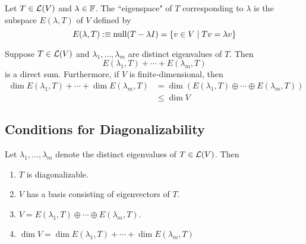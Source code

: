 \setcounter{thm}{51}
\label{eigenspace}
\begin{mydef} 
  Let $T \in \mathcal{L}(V)$ and $\lambda \in \mathbb{F}$. The ``eigenspace" of $T$ corresponding to $\lambda$ is the subspace $E(\lambda, T)$ of $V$ defined by
  \begin{equation}
    E(\lambda, T) :\equiv  \operatorname{null}(T-\lambda I) = \{ v\in V \mid Tv = \lambda v\}
  \end{equation}
\end{mydef}

\setcounter{thm}{53}
\begin{thm} 
  \label{thm: sum of eigenspaces is a direct sum}
  Suppose $T\in \mathcal{L} (V)$ and $\lambda_1, \dots, \lambda_m$ are distinct eigenvalues of $T$. Then
  \begin{equation}
    E(\lambda_1, T) + \cdots + E(\lambda_m, T)
  \end{equation}
  is a direct sum. Furthermore, if $V$ is finite-dimensional, then
  \begin{equation}
    \begin{aligned}
      \dim E(\lambda_1, T) + \cdots + \dim E(\lambda_m, T)
      & = \dim \left( E(\lambda_1, T)  \oplus \cdots \oplus E(\lambda_m, T) \right) \\
      & \leq \dim V
    \end{aligned}
  \end{equation}
\end{thm}

\subsection{Conditions for Diagonalizability}
\setcounter{thm}{54}
\begin{thm} 
  \label{thm: conditions equivalent to diagonalizability}
  Let $\lambda_1, \dots,\lambda_m$ denote the distinct eigenvalues of $T\in \mathcal{L} (V)$. Then
  \begin{enumerate}[label=(\alph*)]
    \item $T$ is diagonalizable.
    \item $V$ has a basis consisting of eigenvectors of $T$.
    \item $V=E(\lambda_1, T) \oplus \cdots \oplus E(\lambda_m, T).$
    \item $\dim V = \dim E(\lambda_1, T) + \cdots + \dim E(\lambda_m, T)$
  \end{enumerate}
\end{thm}

